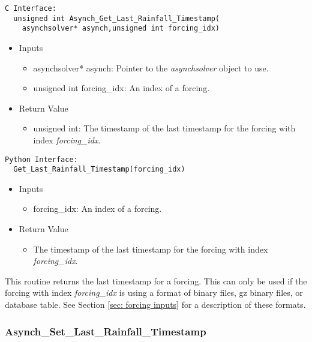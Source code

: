 \documentclass[12pt]{article}
\begin{document}
\begin{lstlisting}[style=CStyle]
  C Interface:
  unsigned int Asynch_Get_Last_Rainfall_Timestamp(
    asynchsolver* asynch,unsigned int forcing_idx)
\end{lstlisting}
\begin{itemize}
 \item Inputs
  \begin{itemize}
   \item asynchsolver* asynch: Pointer to the \emph{asynchsolver} object to use.
   \item unsigned int forcing\_idx: An index of a forcing.
  \end{itemize}
 \item Return Value
  \begin{itemize}
   \item unsigned int: The timestamp of the last timestamp for the forcing with index \emph{forcing\_idx}.
  \end{itemize}
\end{itemize}
\begin{lstlisting}[style=PythonStyle]
  Python Interface:
  Get_Last_Rainfall_Timestamp(forcing_idx)
\end{lstlisting}
\begin{itemize}
 \item Inputs
  \begin{itemize}
   \item forcing\_idx: An index of a forcing.
  \end{itemize}
 \item Return Value
  \begin{itemize}
   \item The timestamp of the last timestamp for the forcing with index \emph{forcing\_idx}.
  \end{itemize}
\end{itemize}
This routine returns the last timestamp for a forcing. This can only be used if the forcing with index \emph{forcing\_idx} is using a format of binary files, gz binary files, or database table. See Section \ref{sec: forcing inputs} for a description of these formats.


\subsubsection{Asynch\_Set\_Last\_Rainfall\_Timestamp} \label{sec: asynch_set_last_rainfall_timestamp}
\end{document}
